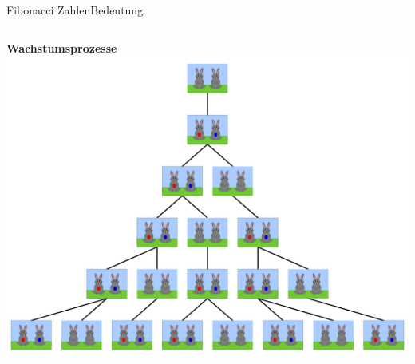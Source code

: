 \documentclass[xelatex,aspectratio=169]{beamer}
\begin{document}
\begin{frame}{Fibonacci Zahlen}{Bedeutung}
  \begin{columns}[t, onlytextwidth]
    \centering \textbf{Wachstumsprozesse}
    \includegraphics[width=\textwidth]{img/fibonacci_rabbit.png}
  \end{columns}
\end{frame}
\end{document}
